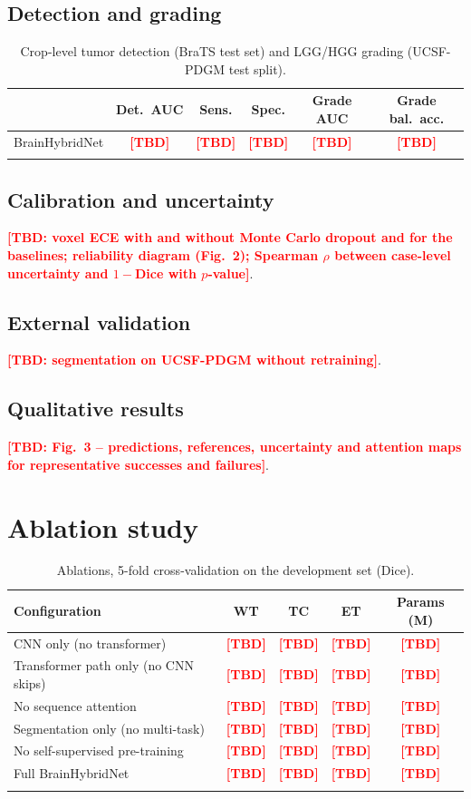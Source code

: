 \documentclass[pdflatex,sn-mathphys-num]{sn-jnl}
\newcommand{\tbd}[1][]{\textcolor{red}{\textbf{[TBD#1]}}}
\begin{document}
\subsection{Detection and grading}
\begin{table}[h]
\caption{Crop-level tumor detection (BraTS test set) and LGG/HGG grading (UCSF-PDGM test split).}
\label{tab:det}
\centering
\begin{tabular}{lccccc}
\toprule
 & Det.\ AUC & Sens. & Spec. & Grade AUC & Grade bal.\ acc.\\
\midrule
BrainHybridNet & \tbd & \tbd & \tbd & \tbd & \tbd\\
\botrule
\end{tabular}
\end{table}

\subsection{Calibration and uncertainty}
\tbd[: voxel ECE with and without Monte Carlo dropout and for the baselines; reliability diagram (Fig.~2); Spearman $\rho$ between case-level uncertainty and $1-$Dice with $p$-value].

\subsection{External validation}
\tbd[: segmentation on UCSF-PDGM without retraining].

\subsection{Qualitative results}
\tbd[: Fig.~3 -- predictions, references, uncertainty and attention maps for representative successes and failures].

\section{Ablation study}\label{sec:ablation}

\begin{table}[h]
\caption{Ablations, 5-fold cross-validation on the development set (Dice).}
\label{tab:ablation}
\centering
\begin{tabular}{lcccc}
\toprule
Configuration & WT & TC & ET & Params (M)\\
\midrule
CNN only (no transformer) & \tbd & \tbd & \tbd & \tbd\\
Transformer path only (no CNN skips) & \tbd & \tbd & \tbd & \tbd\\
No sequence attention & \tbd & \tbd & \tbd & \tbd\\
Segmentation only (no multi-task) & \tbd & \tbd & \tbd & \tbd\\
No self-supervised pre-training & \tbd & \tbd & \tbd & \tbd\\
Full BrainHybridNet & \tbd & \tbd & \tbd & \tbd\\
\botrule
\end{tabular}
\end{table}
\end{document}
